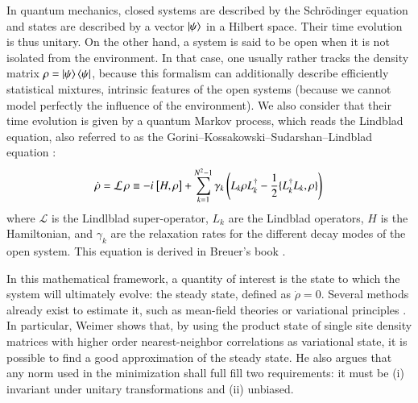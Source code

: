 In quantum mechanics, closed systems are described by the Schrödinger equation and states are described by a vector $\ket{\psi}$  in a Hilbert space. Their time evolution is thus unitary. On the other hand, a system is said to be open when it is not isolated from the environment. In that case, one usually rather tracks the density matrix $\rho = \ket{\psi}\bra{\psi}$, because this formalism can additionally describe efficiently statistical mixtures, intrinsic features of the open systems (because we cannot model perfectly the influence of the environment). We also consider that their time evolution is given by a quantum Markov process, which reads the Lindblad equation, also referred to as the Gorini–Kossakowski–Sudarshan–Lindblad equation :
\begin{equation}
\label{eq:lindblad_general}
\dot \rho = \mathcal{L}\, \rho \equiv - i\mkern1mu \left[ H, \rho \right] + \sum_{k=1}^{N^2-1} \gamma_k \left( L_k \rho L_k^\dag - \frac{1}{2} \{ L_k^\dag L_k, \rho \}  \right)
\end{equation}
where $\mathcal{L}$ is the Lindlblad super-operator, $L_k$ are the Lindblad operators, $H$ is the Hamiltonian, and $\gamma_k$ are the relaxation rates for the different decay modes of the open system. This equation is derived in Breuer's book \cite{breuer2002theory}.


In this mathematical framework, a quantity of interest is the state to which the system will ultimately evolve: the steady state, defined as $\dot \rho = 0$. Several methods already exist to estimate it, such as mean-field theories \cite{diehl2010dynamical, tomadin2011nonequilibrium, lee2011antiferromagnetic} or variational principles \cite{weimer2015variational}. In particular, Weimer \cite{weimer2015variational} shows that, by using the product state of single site density matrices with higher order nearest-neighbor correlations as variational state, it is possible to find a good approximation of the steady state. He also argues that any norm used in the minimization shall full fill two requirements: it must be (i) invariant under unitary transformations and (ii) unbiased.

